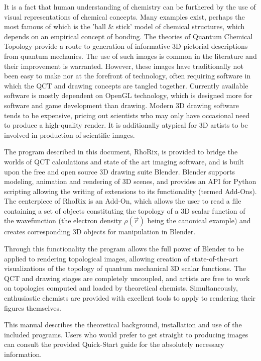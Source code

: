 \documentclass{tufte-book}
\newcommand{\programName}{RhoRix}
\begin{document}
It is a fact that human understanding of chemistry can be furthered by the use of visual representations of chemical concepts. Many examples exist, perhaps the most famous of which is the 'ball \& stick' model of chemical structures, which depends on an empirical concept of bonding. The theories of Quantum Chemical Topology provide a route to generation of informative 3D pictorial descriptions from quantum mechanics. The use of such images is common in the literature and their improvement is warranted.
However, these images have traditionally not been easy to make nor at the forefront of technology, often requiring software in which the QCT and drawing concepts are tangled together. Currently available software is mostly dependent on OpenGL technology, which is designed more for software and game development than drawing. Modern 3D drawing software tends to be expensive, pricing out scientists who may only have occasional need to produce a high-quality render. It is additionally atypical for 3D artists to be involved in production of scientific images.
\par{}
The program described in this document, \programName{}, is provided to bridge the worlds of QCT calculations and state of the art imaging software, and is built upon the free and open source 3D drawing suite Blender. Blender supports modeling, animation and rendering of 3D scenes, and provides an API for Python scripting allowing the writing of extensions to its functionality (termed Add-Ons). The centerpiece of \programName{} is an Add-On, which allows the user to read a file containing a set of objects constituting the topology of a 3D scalar function of the wavefunction (the electron density $\rho(\vec{r})$ being the canonical example) and creates corresponding 3D objects for manipulation in Blender.
\par{}
Through this functionality the program allows the full power of Blender to be applied to rendering topological images,
allowing creation of state-of-the-art visualizations of the topology of quantum mechanical 3D scalar functions. The QCT and drawing stages are completely uncoupled, and artists are free to work on topologies computed and loaded by theoretical chemists. Simultaneously, enthusiastic chemists are provided with excellent tools to apply to rendering their figures themselves.

This manual describes the theoretical background, installation and use of the included programs. Users who would prefer to get straight to producing images can consult the provided Quick-Start guide for the absolutely necessary information.
\end{document}
